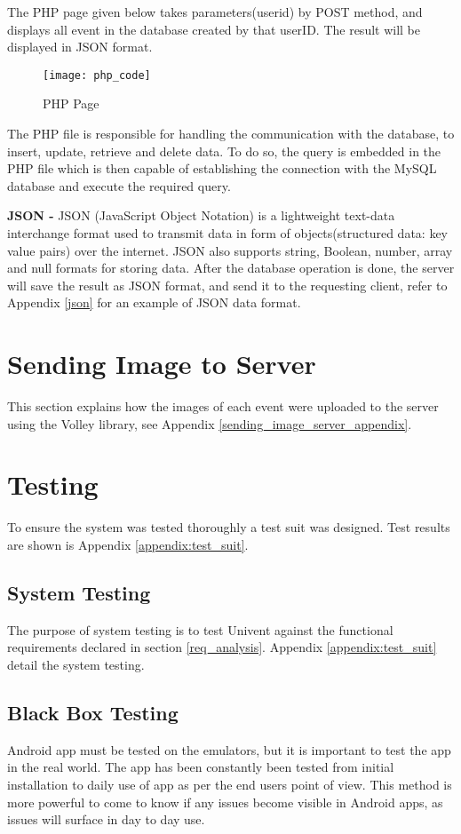 The PHP page given below takes parameters(userid) by POST method, and displays all event in the database created by that userID. The result will be displayed in JSON format.
\begin{figure}[h!]
	\centering       
	\texttt{[image: php\_code]}
	\caption{PHP Page}
	\label{fig:php_code}	
\end{figure}
The PHP file is responsible for handling the communication with the database, to insert, update, retrieve and delete data. To do so, the query is embedded in the PHP file which is then capable of establishing the connection with the MySQL database and execute the required query.

\textbf{JSON -}
JSON (JavaScript Object Notation)  is a lightweight text-data interchange format used to transmit data in form of objects(structured data: key value pairs) over the internet. JSON also supports string, Boolean, number, array and null formats for storing data.
After the database operation is done, the server will save the result as JSON format, and send it to the requesting client, refer to Appendix \ref{json} for an example of JSON data format.

\section{Sending Image to Server}
\label{sending_image_server}
This section explains how the images  of each event were uploaded to the server using the Volley library, see Appendix \ref{sending_image_server_appendix}.

\section{Testing}
To ensure the system was tested thoroughly a test suit was designed.
Test results are shown is Appendix \ref{appendix:test_suit}.
\subsection{System Testing}
The purpose of system testing is to test Univent against the functional requirements declared in section \ref{req_analysis}.
Appendix \ref{appendix:test_suit} detail the system testing.

\subsection{Black Box Testing}
Android app must be tested on the emulators, but it is important to test the app in the real world. The app has been constantly been tested from initial installation to daily use of app as per the end users point of view. This method is more powerful to come to know if any issues become visible in Android apps, as issues will surface in day to day use.

